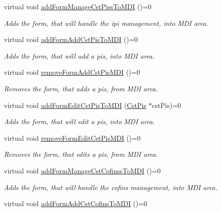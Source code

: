 \begin{DoxyCompactItemize}
virtual void \hyperlink{class_i_main_window_aaa32825250e443efedf94ffaaf74b430}{add\-Form\-Manage\-Cst\-Piss\-To\-M\-D\-I} ()=0
\begin{DoxyCompactList}\small\item\em \-Adds the form, that will handle the ipi management, into \-M\-D\-I area. \end{DoxyCompactList}\item 
virtual void \hyperlink{class_i_main_window_ad609e2a82d1c4676531a88b035c33098}{add\-Form\-Add\-Cst\-Pis\-To\-M\-D\-I} ()=0
\begin{DoxyCompactList}\small\item\em \-Adds the form, that will add a pis, into \-M\-D\-I area. \end{DoxyCompactList}\item 
virtual void \hyperlink{class_i_main_window_a3afa98d45347f9db8fcb8b7e99fa7451}{remove\-Form\-Add\-Cst\-Pis\-M\-D\-I} ()=0
\begin{DoxyCompactList}\small\item\em \-Removes the form, that adds a pis, from \-M\-D\-I area. \end{DoxyCompactList}\item 
virtual void \hyperlink{class_i_main_window_a7877db33765ae52c12e527d0867fd50e}{add\-Form\-Edit\-Cst\-Pis\-To\-M\-D\-I} (\hyperlink{class_cst_pis}{\-Cst\-Pis} $\ast$cst\-Pis)=0
\begin{DoxyCompactList}\small\item\em \-Adds the form, that will edit a pis, into \-M\-D\-I area. \end{DoxyCompactList}\item 
virtual void \hyperlink{class_i_main_window_ae82a2d23a0e268b8e4950069c1b953a2}{remove\-Form\-Edit\-Cst\-Pis\-M\-D\-I} ()=0
\begin{DoxyCompactList}\small\item\em \-Removes the form, that edits a pis, from \-M\-D\-I area. \end{DoxyCompactList}\item 
virtual void \hyperlink{class_i_main_window_a2bb709712a8ee748e0475c8ddb511698}{add\-Form\-Manage\-Cst\-Cofinss\-To\-M\-D\-I} ()=0
\begin{DoxyCompactList}\small\item\em \-Adds the form, that will handle the cofins management, into \-M\-D\-I area. \end{DoxyCompactList}\item 
virtual void \hyperlink{class_i_main_window_a4cab851778571acaa2b69b3e6be26c03}{add\-Form\-Add\-Cst\-Cofins\-To\-M\-D\-I} ()=0

\end{DoxyCompactItemize}
